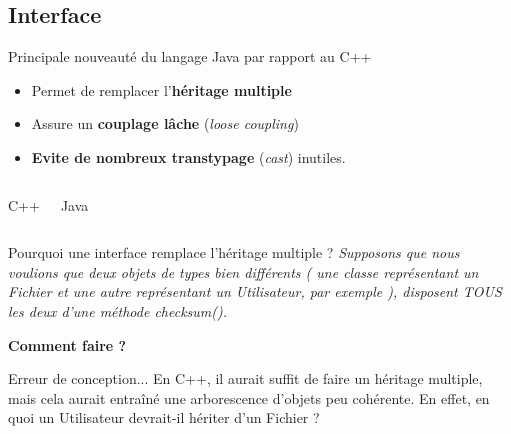 \documentclass[handout]{beamer}
\begin{document}
\subsection{Interface}
\begin{frame}
	\begin{block}{Principale nouveauté du langage Java par rapport au C++}
		\begin{itemize}
			\item Permet de remplacer l'\textbf{héritage multiple}
			\item Assure un \textbf{couplage lâche} (\textit{loose coupling})
			\item \textbf{Evite de nombreux transtypage} (\textit{cast}) inutiles.
		\end{itemize}
	\end{block}

	\begin{columns}
		\begin{block}{C++}
			
		\end{block}
		\begin{block}{Java}
			
		\end{block}
	\end{columns}
\end{frame}

\begin{frame}
	\begin{block}{Pourquoi une interface remplace l'héritage multiple ?}
		\textit{Supposons que nous voulions que deux objets de types bien différents ( une classe représentant un Fichier et une autre représentant un Utilisateur, par exemple ), disposent TOUS les deux d'une méthode checksum().}
	\end{block}
	\begin{center}
		\textbf{Comment faire ?}
	\end{center} 

	\begin{block}{Erreur de conception...}
	En C++, il aurait suffit de faire un héritage multiple, mais cela aurait entraîné une arborescence d'objets peu cohérente. En effet, en quoi un Utilisateur devrait-il hériter d'un Fichier ?
	\end{block}
\end{frame}
\end{document}

